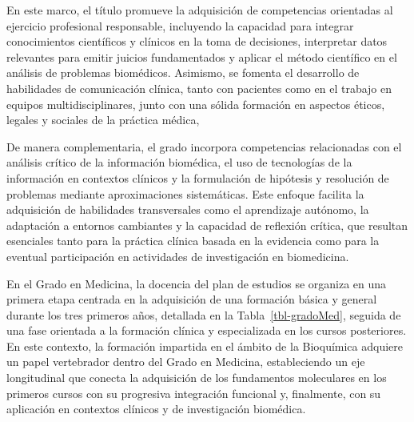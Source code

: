 \documentclass[
  11pt,
  a4paper,
  twoside]{scrreprt}
\begin{document}
En este marco, el título promueve la adquisición de competencias
orientadas al ejercicio profesional responsable, incluyendo la capacidad
para integrar conocimientos científicos y clínicos en la toma de
decisiones, interpretar datos relevantes para emitir juicios
fundamentados y aplicar el método científico en el análisis de problemas
biomédicos. Asimismo, se fomenta el desarrollo de habilidades de
comunicación clínica, tanto con pacientes como en el trabajo en equipos
multidisciplinares, junto con una sólida formación en aspectos éticos,
legales y sociales de la práctica médica,

De manera complementaria, el grado incorpora competencias relacionadas
con el análisis crítico de la información biomédica, el uso de
tecnologías de la información en contextos clínicos y la formulación de
hipótesis y resolución de problemas mediante aproximaciones
sistemáticas. Este enfoque facilita la adquisición de habilidades
transversales como el aprendizaje autónomo, la adaptación a entornos
cambiantes y la capacidad de reflexión crítica, que resultan esenciales
tanto para la práctica clínica basada en la evidencia como para la
eventual participación en actividades de investigación en biomedicina.

En el Grado en Medicina, la docencia del plan de estudios se organiza en
una primera etapa centrada en la adquisición de una formación básica y
general durante los tres primeros años, detallada en la
Tabla~\ref{tbl-gradoMed}, seguida de una fase orientada a la formación
clínica y especializada en los cursos posteriores. En este contexto, la
formación impartida en el ámbito de la Bioquímica adquiere un papel
vertebrador dentro del Grado en Medicina, estableciendo un eje
longitudinal que conecta la adquisición de los fundamentos moleculares
en los primeros cursos con su progresiva integración funcional y,
finalmente, con su aplicación en contextos clínicos y de investigación
biomédica.
\end{document}
